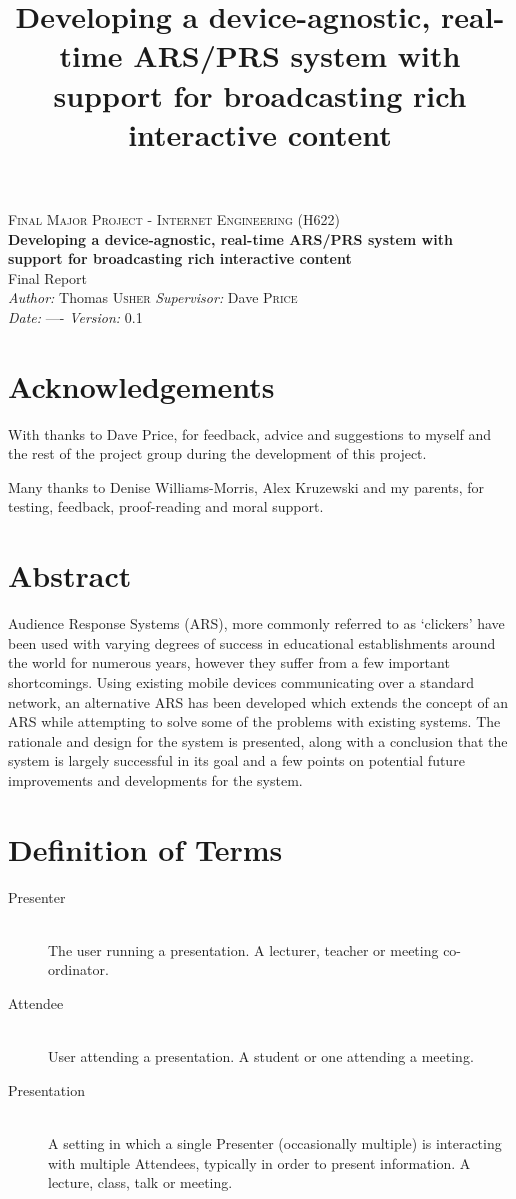 \documentclass[a4papert,11pt,notitlepage]{article}
\title{Developing a device-agnostic, real-time ARS/PRS system with support for
broadcasting rich interactive content}
\begin{document}
\vspace*{\fill}
\begin{center}
\textsc{\Large Final Major Project - Internet Engineering (H622)}\\[0.3cm]
{\Large \bfseries Developing a device-agnostic, real-time ARS/PRS system with support for
broadcasting rich interactive content}\\[0.3cm]
{\Large Final Report}\\[0.3cm]
\emph{Author:} Thomas \textsc{Usher} \hspace{1cm} \emph{Supervisor:} Dave \textsc{Price}\\
\emph{Date:} ---- \hspace{1cm} \emph{Version:} 0.1
\end{center}
\vspace*{\fill}
\pagebreak

\section*{Acknowledgements}
With thanks to Dave Price, for feedback, advice and suggestions to myself and the rest of the project group during the development of this project.

Many thanks to Denise Williams-Morris, Alex Kruzewski and my parents, for testing, feedback, proof-reading and moral support.

\listoftodos{}
\pagebreak

\section*{Abstract}
Audience Response Systems (ARS), more commonly referred to as `clickers' have been used with varying degrees of success in educational establishments around the world for numerous years, however they suffer from a few important shortcomings. Using existing mobile devices communicating over a standard network, an alternative ARS has been developed which extends the concept of an ARS while attempting to solve some of the problems with existing systems. The rationale and design for the system is presented, along with a conclusion that the system is largely successful in its goal and a few points on potential future improvements and developments for the system.

\section*{Definition of Terms}
\begin{description}
\item[Presenter] \hfill \\
The user running a presentation. A lecturer, teacher or meeting co-ordinator.
\item[Attendee] \hfill \\
User attending a presentation. A student or one attending a meeting.
\item[Presentation] \hfill \\
A setting in which a single Presenter (occasionally multiple) is interacting with multiple Attendees, typically in order to present information. A lecture, class, talk or meeting.
\end{description}
\end{document}

